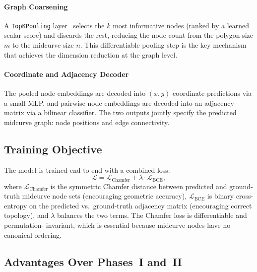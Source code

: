 \documentclass[journal]{IEEEtran}
\begin{document}
\paragraph{Graph Coarsening}
A \texttt{TopKPooling} layer~\cite{gao2019topk} selects the $k$ most
informative nodes (ranked by a learned scalar score) and discards the rest,
reducing the node count from the polygon size $m$ to the midcurve size $n$.
This differentiable pooling step is the key mechanism that achieves the
dimension reduction at the graph level.

\paragraph{Coordinate and Adjacency Decoder}
The pooled node embeddings are decoded into $(x, y)$ coordinate predictions
via a small MLP, and pairwise node embeddings are decoded into an adjacency
matrix via a bilinear classifier.  The two outputs jointly specify the
predicted midcurve graph: node positions and edge connectivity.

\subsection{Training Objective}

The model is trained end-to-end with a combined loss:
\[
  \mathcal{L} = \mathcal{L}_{\text{Chamfer}} + \lambda \cdot \mathcal{L}_{\text{BCE}},
\]
where $\mathcal{L}_{\text{Chamfer}}$ is the symmetric Chamfer distance between
predicted and ground-truth midcurve node sets (encouraging geometric accuracy),
$\mathcal{L}_{\text{BCE}}$ is binary cross-entropy on the predicted vs.\
ground-truth adjacency matrix (encouraging correct topology), and $\lambda$
balances the two terms.  The Chamfer loss is differentiable and permutation-
invariant, which is essential because midcurve nodes have no canonical ordering.

\subsection{Advantages Over Phases~I and~II}
\end{document}
